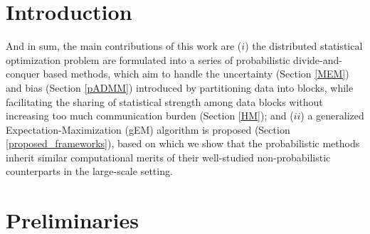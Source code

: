 \documentclass{article}
\newcommand{\1}[0]{\ensuremath{\boldsymbol{1}}\xspace}
\begin{document}

\begin{abstract} 

\end{abstract} 

\section{Introduction}

And in sum, the main contributions of this work are ($i$) the distributed statistical optimization problem are formulated into a series of probabilistic divide-and-conquer based methods, which aim to handle the uncertainty (Section \ref{MEM}) and bias (Section \ref{pADMM}) introduced by partitioning data into blocks, while facilitating the sharing of statistical strength among data blocks without increasing too much communication burden (Section \ref{HM}); and ($ii$) a generalized Expectation-Maximization (gEM) algorithm is proposed (Section \ref{proposed_frameworks}), based on which we show that the probabilistic methods inherit similar computational merits of their well-studied non-probabilistic counterparts in the large-scale setting.

\section{Preliminaries}
\end{document}
